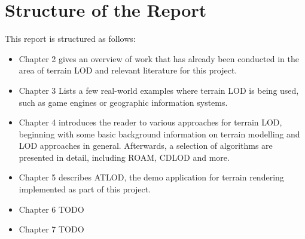 \section{Structure of the Report}
This report is structured as follows:
\begin{itemize}
  \item Chapter 2 gives an overview of work that has already been conducted in the area of terrain LOD
        and relevant literature for this project.
  \item Chapter 3 Lists a few real-world examples where terrain LOD is being used, such as 
        game engines or geographic information systems.
  \item Chapter 4 introduces the reader to various approaches for terrain LOD, beginning with some basic background
        information on terrain modelling and LOD approaches in general. Afterwards, a selection of algorithms
        are presented in detail, including ROAM, CDLOD and more.
  \item Chapter 5 describes ATLOD, the demo application for terrain rendering implemented as part of this project.
  \item Chapter 6 TODO
  \item Chapter 7 TODO 
\end{itemize}


